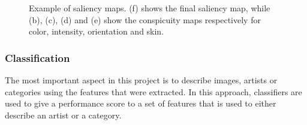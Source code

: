 \begin{figure}[h!]

\caption{Example of saliency maps. (f) shows the final saliency map, while (b), (c), (d) and (e) show the conspicuity maps respectively for color, intensity, orientation and skin.}
\end{figure}


\subsubsection{Classification}


The most important aspect in this project is to describe images, artists or categories using the features that were extracted.
In this approach, classifiers are used to give a performance score to a set of features that is used to either describe an artist or a category.

